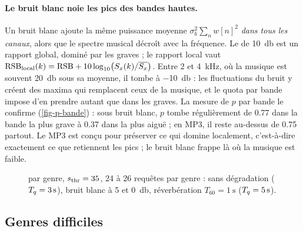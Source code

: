 \paragraph{Le bruit blanc noie les pics des bandes hautes.} Un bruit blanc ajoute la même
puissance moyenne $\sigma_b^2 \sum_n w[n]^2$ \emph{dans tous les canaux}, alors que le spectre
musical décroît avec la fréquence. Le \RSB{} de \qty{10}{\decibel} est un rapport global,
dominé par les graves ; le rapport local vaut
$\mathrm{RSB}_{\text{local}}(k) = \mathrm{RSB} + 10\log_{10}\bigl(S_x(k)/\overline{S_x}\bigr)$. Entre 2 et
\qty{4}{\kilo\hertz}, où la musique est souvent \qty{20}{\decibel} sous sa moyenne, il tombe à
\qty{-10}{\decibel} : les fluctuations du bruit y créent des maxima qui remplacent ceux de la
musique, et le quota par bande impose d'en prendre autant que dans les graves. La mesure de
$p$ par bande le confirme (\cref{fig-p-bande}) : sous bruit blanc, $p$ tombe régulièrement de
\num{0.77} dans la bande la plus grave à \num{0.37} dans la plus aiguë ; en MP3, il reste
au-dessus de \num{0.75} partout. Le MP3 est conçu pour préserver ce qui domine localement,
c'est-à-dire exactement ce que retiennent les pics ; le bruit blanc frappe là où la musique
est faible.

\begin{figure}[t]
  \centering
  \begin{minipage}[t]{0.44\linewidth}
    \centering
    \caption{Proportion $p$ de pics conservés par bande, bruit blanc à \qty{10}{\decibel}
    ($p = \num{0.56}$) et MP3 à \qty{64}{\kilo\bit\per\second} ($p = \num{0.86}$), 100 extraits
    de \qty{8}{\second} alignés.}
    \label{fig-p-bande}
  \end{minipage}\hfill
  \begin{minipage}[t]{0.52\linewidth}
    \centering
    \caption{\TBD{} par genre, $s_{\mathrm{thr}} = 35$, 24 à 26 requêtes par genre : sans dégradation
    ($T_q = \qty{3}{\second}$), bruit blanc à 5 et \qty{0}{\decibel}, réverbération
    $T_{60} = \qty{1}{\second}$ ($T_q = \qty{5}{\second}$).}
    \label{fig-genres}
  \end{minipage}
\end{figure}

\subsection{Genres difficiles}
\label{sec-genres}

